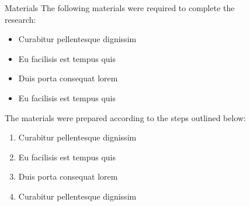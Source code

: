 \documentclass[final]{beamer}
\newlength{\sepwid}
\newlength{\onecolwid}
\newlength{\twocolwid}
\begin{document}
\begin{frame}[t]
\begin{columns}[t]
\begin{column}{\onecolwid}
\begin{block}{Materials}
				The following materials were required to complete the research:

				\begin{itemize}
					\item Curabitur pellentesque dignissim
					\item Eu facilisis est tempus quis
					\item Duis porta consequat lorem
					\item Eu facilisis est tempus quis
				\end{itemize}

				The materials were prepared according to the steps outlined below:

				\begin{enumerate}
					\item Curabitur pellentesque dignissim
					\item Eu facilisis est tempus quis
					\item Duis porta consequat lorem
					\item Curabitur pellentesque dignissim
				\end{enumerate}

			\end{block}


		\end{column} %

		\begin{column}{\sepwid}\end{column} %

		\begin{column}{\twocolwid} %

			\begin{columns}[t,totalwidth=\twocolwid] %

				\begin{column}{\onecolwid}\vspace{-.6in} %



				\end{column} %

				\begin{column}{\onecolwid}\vspace{-.6in} %


\end{column}
\end{columns}
\end{column}
\end{columns}
\end{frame}
\end{document}
